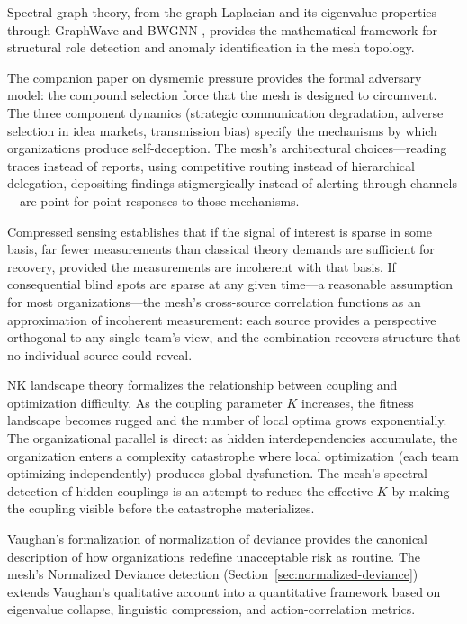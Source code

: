 \documentclass[11pt,a4paper]{article}
\begin{document}
Spectral graph theory, from the graph Laplacian and its eigenvalue properties through GraphWave \citep{donnat2018} and BWGNN \citep{tang2022}, provides the mathematical framework for structural role detection and anomaly identification in the mesh topology.

The companion paper on dysmemic pressure \citep{mcentire2025a} provides the formal adversary model: the compound selection force that the mesh is designed to circumvent. The three component dynamics (strategic communication degradation, adverse selection in idea markets, transmission bias) specify the mechanisms by which organizations produce self-deception. The mesh's architectural choices---reading traces instead of reports, using competitive routing instead of hierarchical delegation, depositing findings stigmergically instead of alerting through channels---are point-for-point responses to those mechanisms.

Compressed sensing \citep{candes2006} establishes that if the signal of interest is sparse in some basis, far fewer measurements than classical theory demands are sufficient for recovery, provided the measurements are incoherent with that basis. If consequential blind spots are sparse at any given time---a reasonable assumption for most organizations---the mesh's cross-source correlation functions as an approximation of incoherent measurement: each source provides a perspective orthogonal to any single team's view, and the combination recovers structure that no individual source could reveal.

NK landscape theory \citep{kauffman1993} formalizes the relationship between coupling and optimization difficulty. As the coupling parameter $K$ increases, the fitness landscape becomes rugged and the number of local optima grows exponentially. The organizational parallel is direct: as hidden interdependencies accumulate, the organization enters a complexity catastrophe where local optimization (each team optimizing independently) produces global dysfunction. The mesh's spectral detection of hidden couplings is an attempt to reduce the effective $K$ by making the coupling visible before the catastrophe materializes.

Vaughan's formalization of normalization of deviance \citep{vaughan1996} provides the canonical description of how organizations redefine unacceptable risk as routine. The mesh's Normalized Deviance detection (Section~\ref{sec:normalized-deviance}) extends Vaughan's qualitative account into a quantitative framework based on eigenvalue collapse, linguistic compression, and action-correlation metrics.
\end{document}
